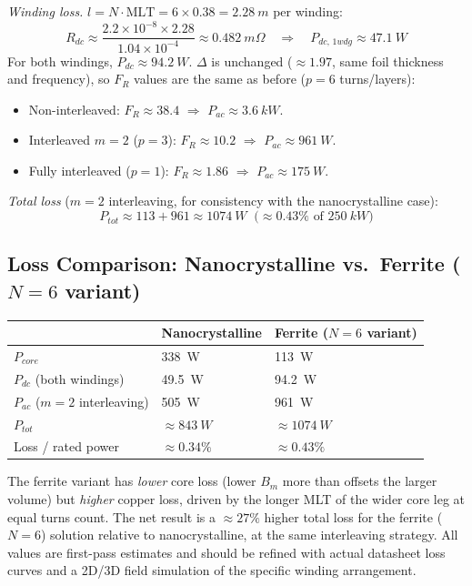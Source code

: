 \documentclass[11pt,a4paper]{article}
\begin{document}
\textit{Winding loss.} $l=N\cdot\mathrm{MLT}=6\times0.38=\SI{2.28}{m}$ per
winding:
\begin{equation}
    R_{dc} \approx \frac{2.2\times10^{-8}\times2.28}{1.04\times10^{-4}} \approx \SI{0.482}{m\Omega}
    \quad\Rightarrow\quad P_{dc,\,1wdg}\approx\SI{47.1}{W}
\end{equation}
For both windings, $P_{dc}\approx\SI{94.2}{W}$. $\Delta$ is unchanged
($\approx1.97$, same foil thickness and frequency), so $F_R$ values are the same
as before ($p=6$ turns/layers):
\begin{itemize}
    \item Non-interleaved: $F_R\approx38.4$ $\Rightarrow$ $P_{ac}\approx\SI{3.6}{kW}$.
    \item Interleaved $m=2$ ($p=3$): $F_R\approx10.2$ $\Rightarrow$ $P_{ac}\approx\SI{961}{W}$.
    \item Fully interleaved ($p=1$): $F_R\approx1.86$ $\Rightarrow$ $P_{ac}\approx\SI{175}{W}$.
\end{itemize}

\textit{Total loss} ($m=2$ interleaving, for consistency with the
nanocrystalline case):
\begin{equation}
    P_{tot} \approx 113+961 \approx \SI{1074}{W} \;\; \big(\approx 0.43\% \text{ of } \SI{250}{kW}\big)
\end{equation}

\subsection*{Loss Comparison: Nanocrystalline vs.\ Ferrite ($N{=}6$ variant)}
\begin{center}
\begin{tabular}{@{}lll@{}}
\toprule
& Nanocrystalline & Ferrite ($N{=}6$ variant) \\
\midrule
$P_{core}$ & \SI{338}{W} & \SI{113}{W} \\
$P_{dc}$ (both windings) & \SI{49.5}{W} & \SI{94.2}{W} \\
$P_{ac}$ ($m{=}2$ interleaving) & \SI{505}{W} & \SI{961}{W} \\
$P_{tot}$ & $\approx\SI{843}{W}$ & $\approx\SI{1074}{W}$ \\
Loss / rated power & $\approx0.34\%$ & $\approx0.43\%$ \\
\bottomrule
\end{tabular}
\end{center}
The ferrite variant has \emph{lower} core loss (lower $B_m$ more than offsets
the larger volume) but \emph{higher} copper loss, driven by the longer MLT of
the wider core leg at equal turns count. The net result is a $\approx27\%$
higher total loss for the ferrite ($N{=}6$) solution relative to nanocrystalline,
at the same interleaving strategy. All values are first-pass estimates and
should be refined with actual datasheet loss curves and a 2D/3D field
simulation of the specific winding arrangement.
\end{document}

